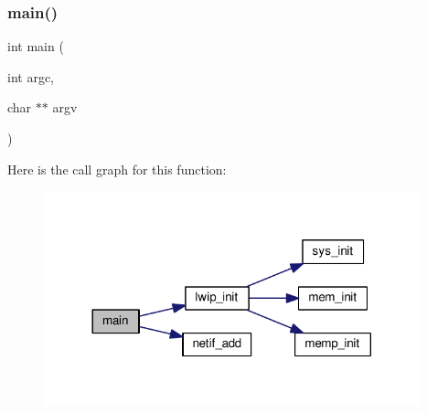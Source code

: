 \subsubsection{\texorpdfstring{main()}{main()}}
{\footnotesize\ttfamily int main (\begin{DoxyParamCaption}\item[{int}]{argc,  }\item[{char $\ast$$\ast$}]{argv }\end{DoxyParamCaption})}

Here is the call graph for this function\+:
\nopagebreak
\begin{figure}[H]
\begin{center}
\leavevmode
\includegraphics[width=308pt]{openmote-cc2538_2lwip_2test_2fuzz_2fuzz_8c_a3c04138a5bfe5d72780bb7e82a18e627_cgraph}
\end{center}
\end{figure}
